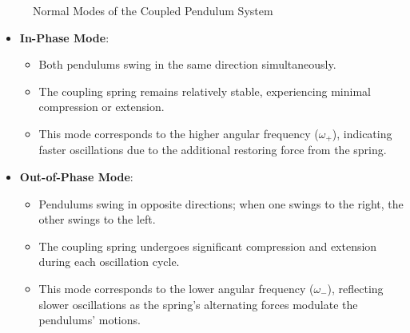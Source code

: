 \documentclass[12pt]{report} %
\begin{document}
\begin{figure}[h]
    \centering
    \caption{Normal Modes of the Coupled Pendulum System}
    \label{fig:normal_modes_diagram}
\end{figure}

\begin{itemize}
    \item \textbf{In-Phase Mode}:
    \begin{itemize}
        \item Both pendulums swing in the same direction simultaneously.
        \item The coupling spring remains relatively stable, experiencing minimal compression or extension.
        \item This mode corresponds to the higher angular frequency (\( \omega_+ \)), indicating faster oscillations due to the additional restoring force from the spring.
    \end{itemize}
    
    \item \textbf{Out-of-Phase Mode}:
    \begin{itemize}
        \item Pendulums swing in opposite directions; when one swings to the right, the other swings to the left.
        \item The coupling spring undergoes significant compression and extension during each oscillation cycle.
        \item This mode corresponds to the lower angular frequency (\( \omega_- \)), reflecting slower oscillations as the spring's alternating forces modulate the pendulums' motions.
    \end{itemize}
\end{itemize}
\end{document}
